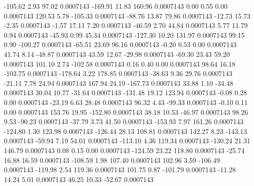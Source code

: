      -105.62        2.93       97.02     0.0007143
     -169.91       11.83      160.96     0.0007143
        0.00        0.55        0.00     0.0007143
      120.53        5.78     -105.33     0.0007143
      -88.76       13.87       79.86     0.0007143
      -12.73       15.73       -2.35     0.0007143
       -1.57       17.11        7.20     0.0007143
      -46.59        2.70       44.84     0.0007143
        5.77       11.79        0.94     0.0007143
      -45.93        0.99       45.34     0.0007143
     -127.30       10.20      131.97     0.0007143
       99.15        0.90     -100.27     0.0007143
      -65.51       23.69       96.16     0.0007143
       -0.20        0.53        0.00     0.0007143
       41.74        8.14      -48.87     0.0007143
       43.59       12.67      -29.98     0.0007143
      -69.30       23.43       59.20     0.0007143
      101.10        2.74     -102.58     0.0007143
        0.16        0.40        0.00     0.0007143
       98.64       16.18     -103.75     0.0007143
     -178.64        3.22      178.85     0.0007143
      -38.63        9.36       29.76     0.0007143
      -21.11        7.78       24.94     0.0007143
      167.94       24.19     -167.73     0.0007143
       33.88        1.10      -34.48     0.0007143
       30.04       10.77      -31.64     0.0007143
     -131.48       19.12      123.94     0.0007143
       -0.08        0.28        0.00     0.0007143
      -23.19        6.63       28.48     0.0007143
       96.32        4.43      -99.33     0.0007143
       -0.10        0.11        0.00     0.0007143
      153.76       19.95     -152.80     0.0007143
       38.18       10.53      -46.97     0.0007143
       98.26        9.53      -90.23     0.0007143
      -37.79        3.73       41.50     0.0007143
     -153.93        7.97      161.26     0.0007143
     -124.80        1.30      123.98     0.0007143
     -126.44       28.13      108.81     0.0007143
      142.27        8.23     -143.13     0.0007143
      -59.94        7.19       54.01     0.0007143
     -113.10        4.36      119.34     0.0007143
     -130.24       21.31      146.79     0.0007143
        0.08        0.15        0.00     0.0007143
     -124.59       23.22      118.80     0.0007143
      -25.74       16.88       16.59     0.0007143
     -108.59        1.98      107.40     0.0007143
      102.96        3.59     -106.49     0.0007143
     -119.98        2.54      119.36     0.0007143
      101.75        0.87     -101.79     0.0007143
      -11.28       14.24        5.01     0.0007143
       46.25       10.33      -52.67     0.0007143
